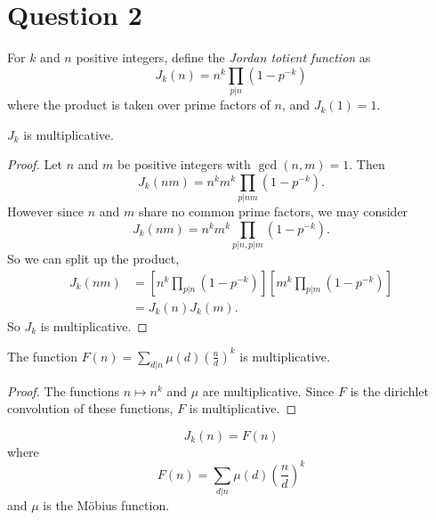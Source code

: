 \documentclass{unswmaths}
\begin{document}
\section*{Question 2}
\begin{unswdef}
    For $k$ and $n$ positive integers, define the \emph{Jordan totient function} as
    \begin{equation*}
        J_k(n) = n^k\prod_{p|n} (1-p^{-k})
    \end{equation*}
    where the product is taken over prime factors of $n$, and $J_k(1) = 1$.
\end{unswdef}
\begin{unswlem}
    $J_k$ is multiplicative.
\end{unswlem}
\begin{proof}
    Let $n$ and $m$ be positive integers with $\gcd(n,m) = 1$. Then
    \begin{equation*}
        J_k(nm) = n^km^k\prod_{p|nm}(1-p^{-k}).
    \end{equation*}
    However since $n$ and $m$ share no common prime factors, we may consider
    \begin{equation*}
        J_k(nm) = n^km^k\prod_{p|n,p|m} (1-p^{-k}).
    \end{equation*}
    So we can split up the product,
    \begin{align*}
        J_k(nm) &= \left[n^k\prod_{p|n}(1-p^{-k})\right]\left[m^k\prod_{p|m}(1-p^{-k})\right]\\
        &= J_k(n)J_k(m).
    \end{align*}
    So $J_k$ is multiplicative.
\end{proof}
\begin{unswlem}
    The function $F(n) = \sum_{d|n}\mu(d)\left(\frac{n}{d}\right)^k$ is multiplicative. 
\end{unswlem}
\begin{proof}
    The functions $n\mapsto n^k$ and $\mu$ are multiplicative.
    Since $F$ is the dirichlet convolution of these functions, $F$
    is multiplicative.    
\end{proof}
\begin{unswthm}
    \begin{equation*}
        J_k(n) = F(n)
    \end{equation*}
    where 
    \begin{equation*}
        F(n) = \sum_{d|n} \mu(d)\left(\frac{n}{d}\right)^k
    \end{equation*}
    and $\mu$ is the M\"obius function.
\end{unswthm}
\end{document}
